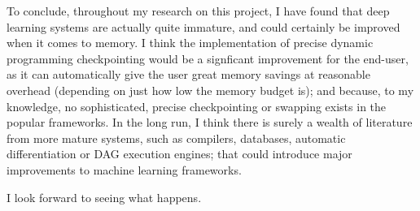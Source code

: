 To conclude, throughout my research on this project, I have found that deep learning systems are actually quite immature, and could certainly be improved when it comes to memory.
I think the implementation of precise dynamic programming checkpointing would be a signficant improvement for the end-user, as it can automatically give the user great memory savings at reasonable overhead (depending on just how low the memory budget is);
and because, to my knowledge, no sophisticated, precise checkpointing or swapping exists in the popular frameworks.
In the long run, I think there is surely a wealth of literature from more mature systems, such as compilers, databases, automatic differentiation or DAG execution engines;
that could introduce major improvements to machine learning frameworks.

I look forward to seeing what happens.
